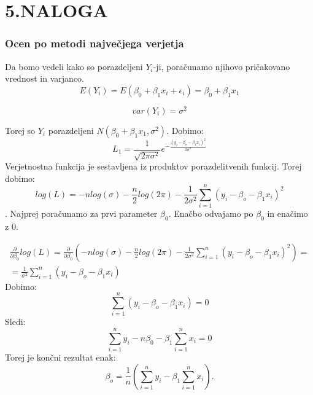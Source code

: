 \documentclass{article}
\begin{document}
\section*{5.NALOGA}
\subsubsection*{Ocen po metodi največjega verjetja}
Da bomo vedeli kako so porazdeljeni $Y_i$-ji, poračunamo njihovo pričakovano vrednost in varjanco.
\begin{equation*}
E(Y_i) = E(\beta_0+\beta_1x_i+\epsilon_i) = \beta_0+\beta_1x_1
\end{equation*}

\begin{equation*}
var(Y_i) = \sigma^2
\end{equation*}

Torej so $Y_i$ porazdeljeni $N( \beta_0+\beta_1x_1, \sigma^2)$.
Dobimo:
\begin{equation*}
L_1 = \frac{1}{\sqrt{2\pi \sigma^2}}e^{-{\frac{(y_i - \beta_o-\beta_1x_i)^2}{2\sigma^2}}}
\end{equation*}
Verjetnostna funkcija je sestavljena iz produktov porazdelitvenih funkcij. Torej dobimo:
\begin{equation*}
log(L) = -nlog(\sigma) - \frac{n}{2}log(2\pi)-\frac{1}{2\sigma^2}\sum_{i=1}^n (y_i-\beta_o-\beta_1x_i)^2
\end{equation*}.
Najprej poračunamo za prvi parameter $\beta_0$. Enačbo odvajamo po $\beta_0$ in enačimo z 0.

\begin{equation*}
\begin{split}
\frac{\partial}{\partial\beta_0} log(L) = \frac{\partial}{\partial\beta_0} (  -nlog(\sigma) - \frac{n}{2}log(2\pi)-\frac{1}{2\sigma^2}\sum_{i=1}^n (y_i-\beta_o-\beta_1x_i)^2)=\\
= \frac{1}{\sigma^2}\sum_{i=1}^n(y_i-\beta_o-\beta_1x_i)
\end{split}
\end{equation*}
Dobimo:
\begin{equation*}
\sum_{i=1}^n(y_i-\beta_o-\beta_1x_i) = 0
\end{equation*}
Sledi:
\begin{equation*}
\sum_{i=1}^n y_i - n\beta_0 -\beta_1\sum_{i=1}^nx_i = 0
\end{equation*}
Torej je končni rezultat enak:
\begin{equation*}
\beta_o = \frac{1}{n}\left( \sum_{i=1}^n y_i - \beta_1\sum_{i=1}^nx_i \right).
\end{equation*}
\end{document}
